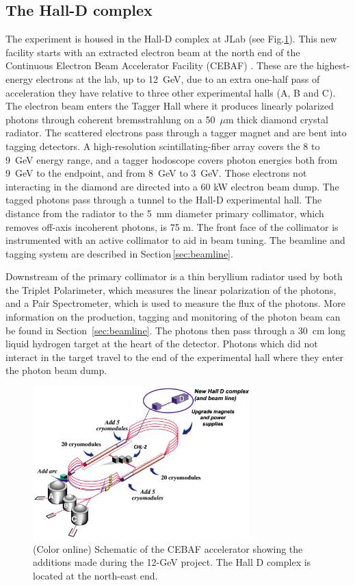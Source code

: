 \subsection[The Hall-D complex]{The Hall-D complex \label{sec:gluexexperiment:complex}}
The \gx{} experiment is housed in the Hall-D complex at JLab (see Fig.\ref{fig:CEBAF-graphic}). This new facility starts with an extracted electron beam at the north end of the Continuous Electron Beam Accelerator Facility (CEBAF) \cite{Leemann:2001dg}. These are the highest-energy electrons at the lab, up to 12~GeV, due to an extra one-half pass of acceleration they have relative to three other experimental halls (A, B and C). The electron beam enters the Tagger Hall where it produces linearly polarized photons through coherent bremsstrahlung on a 50~$\mu$m thick diamond crystal radiator.
The scattered electrons pass through a tagger magnet and are bent into tagging detectors. A high-resolution scintillating-fiber array covers the 8 to 9~GeV energy range, and a tagger hodoscope covers photon energies both from 9~GeV to the endpoint, and from 8~GeV to 3~GeV. Those electrons not interacting in the diamond are directed into a 60 kW electron beam dump. The tagged photons pass through a tunnel to the Hall-D experimental hall. The distance from the radiator to the 5~mm diameter primary collimator, which removes off-axis incoherent photons, is 75 m. The front face of the collimator is instrumented with an active collimator to aid in beam tuning.  The beamline and tagging system are described in Section\,\ref{sec:beamline}.

Downstream of the primary collimator is a thin beryllium radiator used by both the Triplet Polarimeter, which measures the linear polarization of the photons, and a Pair Spectrometer, which is used to measure the flux of the photons. More information on the production, tagging and monitoring of the photon beam can be found in Section~\ref{sec:beamline}. The photons then pass through a 30~cm long liquid hydrogen target at the heart of the \gx{} detector. Photons which did not interact in the target travel to the end of the experimental hall where they enter the photon beam dump.

\begin{figure}[tbp]\centering
\includegraphics[width=0.75\textwidth]{figures/CEBAF-graphic.png}
\caption[]{\label{fig:CEBAF-graphic}(Color online) Schematic of the CEBAF accelerator showing the additions made during the 12-GeV project. The Hall D complex is located at the north-east end.}
\end{figure}

